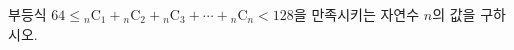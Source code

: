 부등식 $64\le{}_n\mathrm{C}_1+{}_n\mathrm{C}_2+{}_n\mathrm{C}_3+\cdots+{}_n\mathrm{C}_n<128$을 만족시키는 자연수 $n$의 값을 구하시오.
